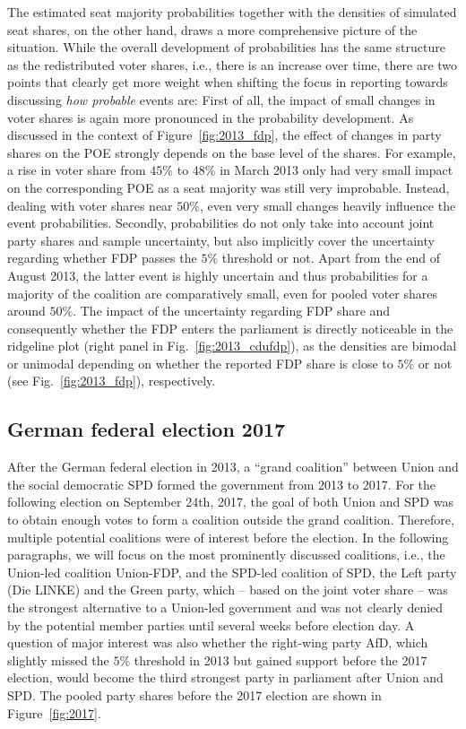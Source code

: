 \documentclass[smallcondensed]{svjour3}     %
\begin{document}
The estimated seat majority probabilities together with
the densities of simulated seat shares, on the other hand,  draws a more
comprehensive picture of the situation. While the overall development of
probabilities has the same structure as the redistributed voter shares, i.e.,
there is an increase over time, there are two points that clearly get more weight
when shifting the focus in reporting towards discussing {\it how probable} events are:
First of all, the impact of small changes in voter shares is again more pronounced
in the probability development.
As discussed in the context of Figure~\ref{fig:2013_fdp}, the effect of changes
in party shares on the POE strongly depends on the base level of the shares.
For example, a rise in voter share from $45\%$ to $48\%$ in March 2013 only had
very small impact on the corresponding POE as a seat majority was still very
improbable. Instead, dealing with voter shares near $50\%$, even very small changes
heavily influence the event probabilities. Secondly, probabilities do not only
take into account joint party shares and sample uncertainty,
but also implicitly cover the uncertainty regarding whether FDP passes the $5\%$
threshold or not. Apart from the end of August 2013, the latter event
is highly uncertain and thus probabilities for a majority of
the coalition are comparatively small, even for pooled voter shares around $50\%$.
The impact of the uncertainty regarding FDP share and consequently whether the
FDP enters the parliament is directly noticeable in the ridgeline plot
(right panel in Fig.~\ref{fig:2013_cdufdp}), as the densities are bimodal or
unimodal depending on whether the reported FDP share is close to $5\%$ or not
(see Fig.~\ref{fig:2013_fdp}), respectively.



\subsection{German federal election 2017} \label{subsec:2017}
After the German federal election in 2013, a ``grand coalition'' between Union and the social
democratic SPD formed the government from 2013 to 2017.
For the following election on September 24th, 2017, the goal of both Union and SPD
was to obtain enough votes to form a coalition outside the grand
coalition. Therefore, multiple potential coalitions were of interest before the
election. In the following paragraphs, we will focus on the most prominently
discussed coalitions, i.e., the Union-led coalition Union-FDP, and the
SPD-led coalition of SPD, the Left party (Die LINKE) and the Green party, which
-- based on the joint voter share -- was the strongest alternative to a Union-led
government and was not clearly denied by the potential member parties until several weeks
before election day.
A question of major interest was also whether the right-wing party AfD, which
slightly missed the $5\%$ threshold in 2013 but gained support before the 2017 election,
would become the third strongest party in parliament after Union and SPD.
The pooled party shares before the 2017 election are shown in Figure~\ref{fig:2017}.
\end{document}
